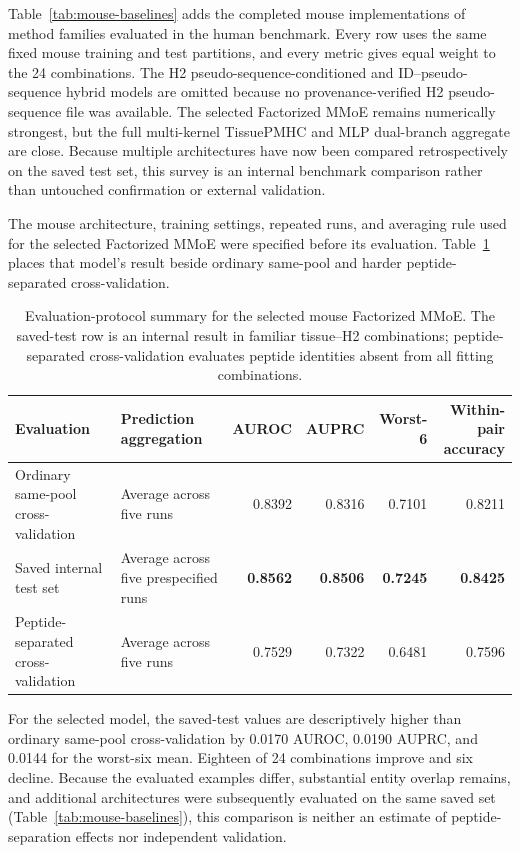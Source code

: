 Table~\ref{tab:mouse-baselines} adds the completed mouse implementations of method families evaluated in the human benchmark. Every row uses the same fixed mouse training and test partitions, and every metric gives equal weight to the 24 combinations. The H2 pseudo-sequence-conditioned and ID--pseudo-sequence hybrid models are omitted because no provenance-verified H2 pseudo-sequence file was available. The selected Factorized MMoE remains numerically strongest, but the full multi-kernel TissuePMHC and MLP dual-branch aggregate are close. Because multiple architectures have now been compared retrospectively on the saved test set, this survey is an internal benchmark comparison rather than untouched confirmation or external validation.

The mouse architecture, training settings, repeated runs, and averaging rule used for the selected Factorized MMoE were specified before its evaluation. Table~\ref{tab:mouse-protocol-summary} places that model's result beside ordinary same-pool and harder peptide-separated cross-validation.

\begin{table}[t]
\centering
\caption{Evaluation-protocol summary for the selected mouse Factorized MMoE. The saved-test row is an internal result in familiar tissue--H2 combinations; peptide-separated cross-validation evaluates peptide identities absent from all fitting combinations.}
\label{tab:mouse-protocol-summary}
\footnotesize
\renewcommand{\arraystretch}{1.20}
\setlength{\tabcolsep}{2pt}
\begin{tabularx}{\textwidth}{>{\raggedright\arraybackslash}X
                            >{\raggedright\arraybackslash}Xrrrr}
\toprule
Evaluation & Prediction aggregation & AUROC & AUPRC & Worst-6 & \shortstack{Within-pair\\accuracy} \\ 
\midrule
Ordinary same-pool cross-validation & Average across five runs & 0.8392 & 0.8316 & 0.7101 & 0.8211 \\ 
Saved internal test set & Average across five prespecified runs & \textbf{0.8562} & \textbf{0.8506} & \textbf{0.7245} & \textbf{0.8425} \\ 
Peptide-separated cross-validation & Average across five runs & 0.7529 & 0.7322 & 0.6481 & 0.7596 \\ 
\bottomrule
\end{tabularx}
\end{table}

For the selected model, the saved-test values are descriptively higher than ordinary same-pool cross-validation by 0.0170 AUROC, 0.0190 AUPRC, and 0.0144 for the worst-six mean. Eighteen of 24 combinations improve and six decline. Because the evaluated examples differ, substantial entity overlap remains, and additional architectures were subsequently evaluated on the same saved set (Table~\ref{tab:mouse-baselines}), this comparison is neither an estimate of peptide-separation effects nor independent validation.

